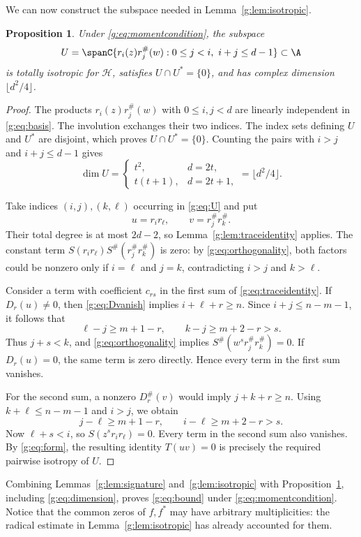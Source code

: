 \documentclass[UTF8,11pt]{ctexart}
\newtheorem{prop}[thm]{Proposition}
\theoremstyle{definition}
\numberwithin{equation}{section}
\newcommand{\HH}{\mathcal H}\newcommand{\Ecal}{\mathcal E}
\begin{document}
We can now construct the subspace needed in Lemma~\ref{g:lem:isotropic}.
\begin{prop}\label{g:prop:U}
Under \eqref{g:eq:momentcondition}, the subspace
\begin{equation}\label{g:eq:U}
 U=\spanC\{r_i(z)r_j^\#(w):0\le j<i,\ i+j\le d-1\}\subset\A
\end{equation}
is totally isotropic for $\HH$, satisfies $U\cap U^*=\{0\}$, and has
complex dimension $\lfloor d^2/4\rfloor$.
\end{prop}
\begin{proof}
The products $r_i(z)r_j^\#(w)$ with $0\le i,j<d$ are linearly independent
in \eqref{g:eq:basis}. The involution exchanges their two indices.
The index sets defining $U$ and $U^*$ are disjoint, which proves
$U\cap U^*=\{0\}$. Counting the pairs with $i>j$ and $i+j\le d-1$ gives
\begin{equation}\label{g:eq:dimension}
 \dim U=
 \begin{cases}
 t^2,&d=2t,\\
 t(t+1),&d=2t+1,
 \end{cases}
 =\lfloor d^2/4\rfloor.
\end{equation}

Take indices $(i,j),(k,\ell)$ occurring in \eqref{g:eq:U} and put
\[
 u=r_i r_\ell,\qquad v=r_j^\# r_k^\#.
\]
Their total degree is at most $2d-2$, so Lemma~\ref{g:lem:traceidentity}
applies. The constant term $S(r_i r_\ell)S^\#(r_j^\#r_k^\#)$ is zero:
by \eqref{g:eq:orthogonality}, both factors could be nonzero only if
$i=\ell$ and $j=k$, contradicting $i>j$ and $k>\ell$.

Consider a term with coefficient $c_{rs}$ in the first sum of
\eqref{g:eq:traceidentity}. If $D_r(u)\ne0$, then \eqref{g:eq:Dvanish} implies
$i+\ell+r\ge n$. Since $i+j\le n-m-1$, it follows that
\[
 \ell-j\ge m+1-r,\qquad k-j\ge m+2-r>s.
\]
Thus $j+s<k$, and \eqref{g:eq:orthogonality} implies
$S^\#(w^s r_j^\# r_k^\#)=0$. If $D_r(u)=0$, the same term is zero directly.
Hence every term in the first sum vanishes.

For the second sum, a nonzero $D_r^\#(v)$ would imply $j+k+r\ge n$.
Using $k+\ell\le n-m-1$ and $i>j$, we obtain
\[
 j-\ell\ge m+1-r,\qquad i-\ell\ge m+2-r>s.
\]
Now $\ell+s<i$, so $S(z^s r_i r_\ell)=0$. Every term in the second sum
also vanishes. By \eqref{g:eq:form}, the resulting identity $T(uv)=0$ is
precisely the required pairwise isotropy of $U$.
\end{proof}

Combining Lemmas~\ref{g:lem:signature} and~\ref{g:lem:isotropic} with
Proposition~\ref{g:prop:U}, including \eqref{g:eq:dimension}, proves \eqref{g:eq:bound} under
\eqref{g:eq:momentcondition}. Notice that the common zeros of $f,f^*$ may
have arbitrary multiplicities: the radical estimate in
Lemma~\ref{g:lem:isotropic} has already accounted for them.
\end{document}
